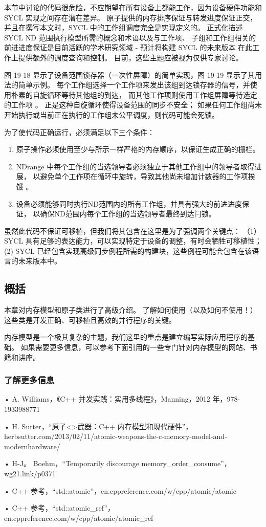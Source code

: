 本节中讨论的代码很危险，不应期望在所有设备上都能工作，因为设备硬件功能和 SYCL 实现之间存在潜在差异。 
原子提供的内存排序保证与转发进度保证正交，并且在撰写本文时，SYCL 中的工作组调度完全是实现定义的。 
正式化描述 SYCL ND 范围执行模型所需的概念和术语以及与工作项、
子组和工作组相关的前进进度保证是目前活跃的学术研究领域 - 
预计将构建 SYCL 的未来版本 在此工作上提供额外的调度查询和控制。 目前，这些主题应被视为仅供专家讨论。

图 19-18 显示了设备范围锁存器（一次性屏障）的简单实现，图 19-19 显示了其用法的简单示例。 
每个工作组选择一个工作项来发出该组到达锁存器的信号，并使用朴素的自旋循环等待其他组的到达，
而其他工作项则使用工作组屏障等待选定的工作项 。 
正是这种自旋循环使得设备范围的同步不安全； 
如果任何工作组尚未开始执行或当前正在执行的工作组未公平调度，则代码可能会死锁。

为了使代码正确运行，必须满足以下三个条件：

\begin{enumerate}
	\item 原子操作必须使用至少与所示一样严格的内存顺序，以保证生成正确的栅栏。

	\item NDrange 中每个工作组的当选领导者必须独立于其他工作组中的领导者取得进展，
	以避免单个工作项在循环中旋转，导致其他尚未增加计数器的工作项挨饿 。

	\item 设备必须能够同时执行ND范围内的所有工作组，并具有强大的前进进度保证，
	以确保ND范围内每个工作组的当选领导者最终到达闩锁。
\end{enumerate}

虽然此代码不保证可移植，但我们将其包含在这里是为了强调两个关键点：
（1）SYCL 具有足够的表达能力，可以实现特定于设备的调整，有时会牺牲可移植性； 
(2) SYCL 已经包含实现高级同步例程所需的构建块，这些例程可能会包含在该语言的未来版本中。

\subsection{概括}
本章对内存模型和原子类进行了高级介绍。 
了解如何使用（以及如何不使用！）这些类是开发正确、可移植且高效的并行程序的关键。

内存模型是一个极其复杂的主题，我们这里的重点是建立编写实际应用程序的基础。 
如果需要更多信息，可以参考下面引用的一些专门针对内存模型的网站、书籍和讲座。

\subsubsection{了解更多信息}
• A. Williams，《C++ 并发实践：实用多线程》，Manning，2012 年，978-1933988771

• H. Sutter，“原子<>武器：C++ 内存模型和现代硬件”，herbsutter.com/2013/02/11/atomic-weapons-the-c-memory-model-and-modernhardware/

• H-J。 Boehm，“Temporarily discourage memory\_order\_consume”，wg21.link/p0371

• C++ 参考，“std::atomic”，en.cppreference.com/w/cpp/atomic/atomic

• C++ 参考，“std::atomic\_ref”，en.cppreference.com/w/cpp/atomic/atomic\_ref
